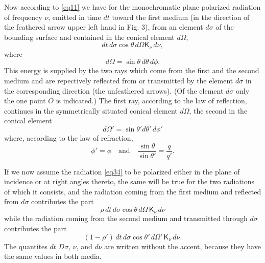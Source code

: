 \documentclass[12pt,oneside]{book}
\begin{document}
Now according to \eqref{eq11} we have for the monochromatic plane polarized radiation of frequency $\nu$, emitted in time $dt$ toward the first medium (in the direction of the feathered arrow upper left hand in Fig. 3), from an element $d\sigma$ of the bounding surface and contained in the conical element $d\Omega$,
\begin{equation}
    dt\, d\sigma\cos\theta\, d\Omega\mathsf{K}_\nu\, d\nu,
    \label{eq34}
\end{equation}
where
\begin{equation}
    d\Omega=\sin\theta\, d\theta\, d\phi.
    \label{eq35}
\end{equation}
This energy is supplied by the two rays which come from the first and the second medium and are repectively reflected from or transmitted by the element $d\sigma$ in the corresponding direction (the unfeathered arrows). (Of the element $d\sigma$ only the one point $O$ is indicated.) The first ray, according to the law of reflection, continues in the symmetrically situated conical element $d\Omega$, the second in the conical element
\begin{equation}
    d\Omega'=\sin\theta' d\theta'\, d\phi'
    \label{eq36}
\end{equation}
where, according to the law of refraction,
\begin{equation}
    \phi'=\phi \quad \text{and}\quad \frac{\sin\theta}{\sin\theta'}=\frac{q}{q'}.
    \label{eq37}
\end{equation} \par

If we now assume the radiation \eqref{eq34} to be polarized either in the plane of incidence or at right angles thereto, the same will be true for the two radiations of which it consists, and the radiation coming from the first medium and reflected from $d\sigma$ contributes the part
\begin{equation}
    \rho\, dt\, d\sigma \cos\theta\, d\Omega\, \mathsf{K}_\nu\, d\nu
    \label{eq38}
\end{equation}
while the radiation coming from the second medium and transmitted through $d\sigma$ contributes the part
\begin{equation}
    (1-\rho')\, dt\, d\sigma \cos\theta'\, d\Omega'\, \mathsf{K}_\nu\, d\nu.
    \label{eq39}
\end{equation}
The quantites $dt$ $D\sigma$, $\nu$, and $d\nu$ are written without the accent, because they have the same values in both media. \par
\end{document}
